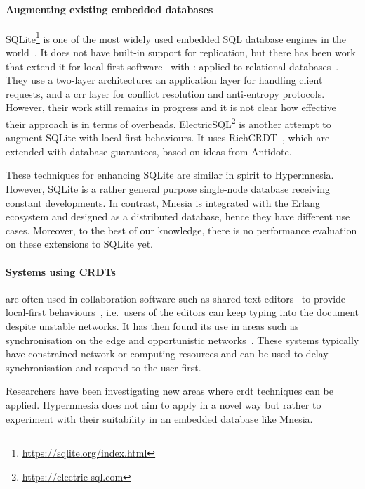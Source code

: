 \paragraph{Augmenting existing embedded databases}

SQLite\footnote{\url{https://sqlite.org/index.html}} is one of the most widely 
used embedded SQL database engines in the world~\cite{hipp2019sqlite}. 
It does not have built-in support for replication, but there has been work that 
extend it for local-first software~\cite{tomter2021SQLitelocal} with
:  applied to relational databases~\cite{yu2020CausalLen}.
They use a two-layer architecture: an application layer for handling client requests,
and a \acrshort{crr} layer for conflict resolution and anti-entropy protocols.
However, their work still remains in progress and it is not clear how effective their
approach is in terms of overheads. ElectricSQL\footnote{\url{https://electric-sql.com}} 
is another attempt to augment SQLite with local-first behaviours. 
It uses RichCRDT~\cite{balegas2022richcrdt}, which are 
extended with database guarantees, based on ideas from Antidote.

These techniques for enhancing SQLite are similar in spirit to Hypermnesia. However,
SQLite is a rather general purpose single-node database receiving constant developments.
In contrast, Mnesia is integrated with the Erlang ecosystem and designed as a 
distributed database, hence they have different use cases.
Moreover, to the best of our knowledge, there is no performance evaluation on 
these extensions to SQLite yet.


\paragraph{Systems using CRDTs} \label{subsec:related crdt system}

 are often used in collaboration software such
as shared text editors~\cite{weiss2010Logoot} to provide local-first 
behaviours~\cite{kleppmann2019local-first}, i.e.\ users
of the editors can keep typing into the document despite unstable networks.
It has then found its use in areas such as synchronisation on the edge and
opportunistic networks~\cite{guidec2023opportunistic,yu2020crr}. 
These systems typically have constrained network or computing resources and 
 can be used to delay synchronisation and respond to the user first. 

Researchers have been investigating new areas where \acrshort{crdt} techniques
can be applied. Hypermnesia does not aim to apply  in a novel
way but rather to experiment with their suitability in an embedded database like Mnesia.

